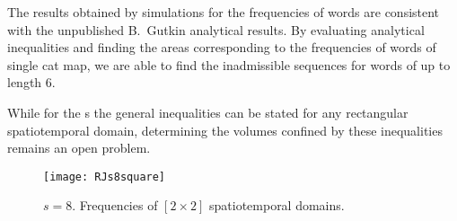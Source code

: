 The results obtained by simulations for the frequencies of words are
consistent with the unpublished B.~Gutkin analytical results. By
evaluating  analytical inequalities and finding the areas corresponding
to the frequencies of words of single cat map, we are able to find the
inadmissible sequences for words of up to length 6.

While for the \catlatt s the general inequalities can be stated for any
rectangular spatiotemporal domain, determining the volumes confined by these
inequalities remains an open problem.

\begin{figure}
	\texttt{[image: RJs8square]}
	\caption{\label{RJs8square}
$s=8$. Frequencies of $[2\!\times\!2]$ spatiotemporal domains.
            }
\end{figure}


\renewcommand{\cl}[1]{{\ensuremath{|#1|}}}  %
\printbibliography[heading=subbibintoc,title={References}]
